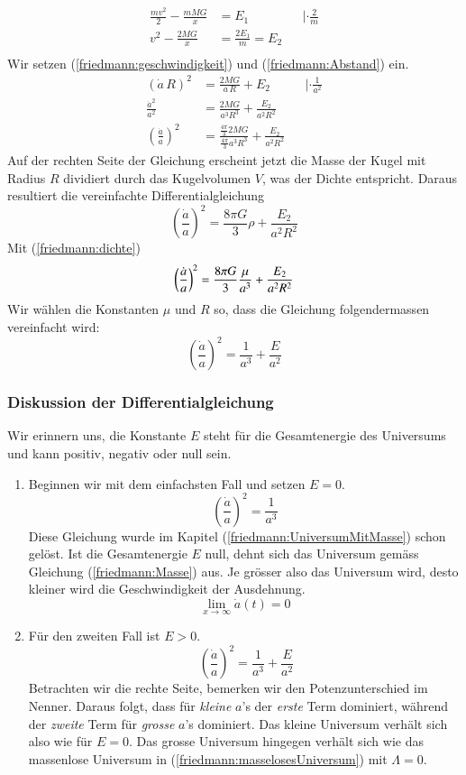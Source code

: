 \begin{refsection}
\begin{align*}
	\frac{m v^2}{2} - \frac{m M G}{x} &= E_1 &&| \cdot\frac{2}{m} \\ 
	v^2 - \frac{2 M G}{x} &= \frac{2E_1}{m} = E_2\\	
\end{align*}
Wir setzen (\ref{friedmann:geschwindigkeit}) und (\ref{friedmann:Abstand}) ein.
\begin{align*}
	\left( \dot{a} \, R\right)^2 &= \frac{2 M G}{a\,R} + E_2 &&| \cdot \frac{1}{a^2}\\
	\frac{\dot{a}^2}{a^2} &= \frac{2 M G}{a^3 R^3} + \frac{E_2}{a^2 R^2} \\
	\left(\frac{\dot{a}}{a} \right)^2 &= \frac{\frac{4 \pi}{3}2 M G}{\frac{4 \pi}{3} a^3 R^3} + \frac{E_2}{a^2 R^2}
\end{align*}
Auf der rechten Seite der Gleichung erscheint jetzt die Masse der Kugel mit Radius $R$ dividiert durch das Kugelvolumen $V$, was der Dichte entspricht. Daraus resultiert die vereinfachte Differentialgleichung 
\begin{equation}
\left(\frac{\dot{a}}{a} \right)^2 = \frac{8 \pi G}{3} \rho + \frac{E_2}{a^2 R^2}
\label{friedmann:EnergieerhaltungUniversum}
\end{equation}
Mit (\ref{friedmann:dichte})
\[\left(\frac{\dot{a}}{a} \right)^2 = \frac{8 \pi G}{3} \frac{\mu}{a^3} + \frac{E_2}{a^2 R^2} \\\]
Wir wählen die Konstanten $\mu$ und $R$ so, dass die Gleichung folgendermassen vereinfacht wird:
\begin{equation}
\left(\frac{\dot{a}}{a} \right)^2 = \frac{1}{a^3} + \frac{E}{a^2}
\end{equation}

\subsubsection{Diskussion der Differentialgleichung}
Wir erinnern uns, die Konstante $E$ steht für die Gesamtenergie des Universums und kann positiv, negativ oder null sein.
\begin{enumerate}
	\item Beginnen wir mit dem einfachsten Fall und setzen $E = 0$.
	\[\left(\frac{\dot{a}}{a} \right)^2 = \frac{1}{a^3}\]
	Diese Gleichung wurde im Kapitel (\ref{friedmann:UniversumMitMasse}) schon gelöst. Ist die Gesamtenergie $E$ null, dehnt sich das Universum gemäss Gleichung (\ref{friedmann:Masse}) aus. Je grösser also das Universum wird, desto kleiner wird die Geschwindigkeit der Ausdehnung.
	\[\lim_{x\to\infty} \dot{a}(t) = 0\]
	\item Für den zweiten Fall ist $E > 0$.
	\[\ \left(\frac{\dot{a}}{a} \right)^2 = \frac{1}{a^3} + \frac{E}{a^2}\]
	Betrachten wir die rechte Seite, bemerken wir den Potenzunterschied im Nenner. Daraus folgt, dass für {\em kleine} $a$'s der {\em erste} Term dominiert, während der {\em zweite} Term für {\em grosse} $a$'s dominiert. Das kleine Universum verhält sich also wie für $E = 0$. Das grosse Universum hingegen verhält sich wie das massenlose Universum in (\ref{friedmann:masselosesUniversum}) mit $\Lambda = 0$.  
	

\end{enumerate}
\end{refsection}
